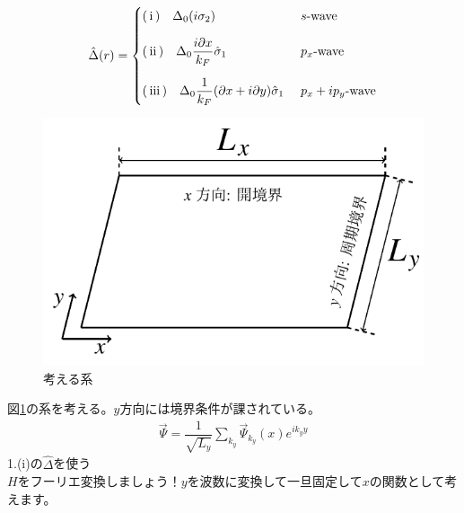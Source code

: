 \documentclass{jarticle}
\begin{document}
\begin{align}
\hat{\Delta}(r)=
\begin{cases}
$\rm(\hspace{.18em}i\hspace{.18em})\quad$\Delta_0(i\sigma_2)
& \mbox{$s$-wave}
\vspace*{1em}\\
$\rm(\hspace{.18em}ii\hspace{.18em})$\quad\Delta_0\dfrac{i\partial x}{k_F}\hat\sigma_1
& \mbox{$p_x$-wave}
\vspace*{1em}\\
$\rm(\hspace{.18em}iii\hspace{.18em})$\quad\Delta_0\dfrac{1}{k_F}(\partial x+i\partial y)\hat\sigma_1\
& \mbox{$p_x+ip_y$-wave}
\end{cases}
\label{delta}
\end{align}
\begin{figure}[H]
	\centering
	\includegraphics[scale=1]{../../14/KS/figure_fix.pdf}
	\caption{考える系}
	\label{system}
\end{figure}
図\ref{system}の系を考える。$y$方向には境界条件が課されている。
\begin{align}
\vec{\Psi}=\dfrac{1}{\sqrt{L_y}}\displaystyle\sum_{k_y}\vec{\Psi}_{k_y}(x)e^{ik_yy}
\end{align}
1.(i)の$\hat{\Delta}$を使う\\		                                               	%
\ding{"AB} $H$をフーリエ変換しましょう！$y$を波数に変換して一旦固定して$x$の関数として考えます。
\end{document}
